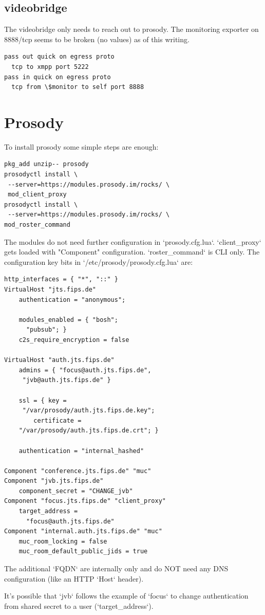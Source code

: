 \documentclass[conference]{IEEEtran}
\begin{document}
\subsection{videobridge}
The videobridge only needs to reach out to prosody. The monitoring exporter on 8888/tcp
seems to be broken (no values) as of this writing.
\begin{verbatim}
pass out quick on egress proto
  tcp to xmpp port 5222
pass in quick on egress proto
  tcp from \$monitor to self port 8888
\end{verbatim}

\section{Prosody}
To install prosody some simple steps are enough:
\begin{verbatim}
pkg_add unzip-- prosody
prosodyctl install \
 --server=https://modules.prosody.im/rocks/ \
 mod_client_proxy
prosodyctl install \
 --server=https://modules.prosody.im/rocks/ \
mod_roster_command
\end{verbatim}
The modules do not need further configuration in `prosody.cfg.lua`.
`client\_proxy` gets loaded with "Component" configuration. `roster\_command` is CLI only.
The configuration key bits in `/etc/prosody/prosody.cfg.lua` are:
\begin{verbatim}
http_interfaces = { "*", "::" }
VirtualHost "jts.fips.de"
    authentication = "anonymous";

    modules_enabled = { "bosh";
      "pubsub"; }
    c2s_require_encryption = false

VirtualHost "auth.jts.fips.de"
    admins = { "focus@auth.jts.fips.de",
     "jvb@auth.jts.fips.de" }

    ssl = { key =
     "/var/prosody/auth.jts.fips.de.key";
        certificate =
    "/var/prosody/auth.jts.fips.de.crt"; }

    authentication = "internal_hashed"
    
Component "conference.jts.fips.de" "muc"
Component "jvb.jts.fips.de"
    component_secret = "CHANGE_jvb"
Component "focus.jts.fips.de" "client_proxy"
    target_address = 
      "focus@auth.jts.fips.de"
Component "internal.auth.jts.fips.de" "muc"
    muc_room_locking = false
    muc_room_default_public_jids = true
\end{verbatim}
The additional `FQDN` are internally only and
do NOT need any DNS configuration (like an
HTTP `Host` header).

It's possible that `jvb` follows the example of
`focus` to change authentication from shared secret
to a user (`target\_address`).
\end{document}
